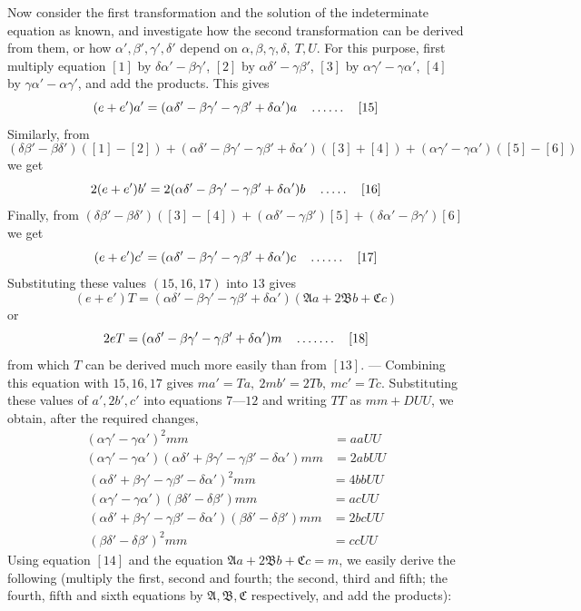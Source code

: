 Now consider the first transformation and the solution of the indeterminate equation as known, and investigate how the second transformation can be derived from them, or how $\alpha',\beta',\gamma',\delta'$ depend on $\alpha,\beta,\gamma,\delta,\ T,U$. For this purpose, first multiply equation $[1]$ by $\delta\alpha'-\beta\gamma'$, $[2]$ by $\alpha\delta'-\gamma\beta'$, $[3]$ by $\alpha\gamma'-\gamma\alpha'$, $[4]$ by $\gamma\alpha'-\alpha\gamma'$, and add the products. This gives
\[
(e+e')a'=(\alpha\delta'-\beta\gamma'-\gamma\beta'+\delta\alpha')a\quad\mathinner{.\,.\,.\,.\,.\,.}\quad[15]
\]
Similarly, from
\[
(\delta\beta'-\beta\delta')([1]-[2])+(\alpha\delta'-\beta\gamma'-\gamma\beta'+\delta\alpha')([3]+[4])+(\alpha\gamma'-\gamma\alpha')([5]-[6])
\]
we get
\[
2(e+e')b'=2(\alpha\delta'-\beta\gamma'-\gamma\beta'+\delta\alpha')b\quad\mathinner{.\,.\,.\,.\,.}\quad[16]
\]
Finally, from $(\delta\beta'-\beta\delta')([3]-[4])+(\alpha\delta'-\gamma\beta')[5]+(\delta\alpha'-\beta\gamma')[6]$ we get
\[
(e+e')c'=(\alpha\delta'-\beta\gamma'-\gamma\beta'+\delta\alpha')c\quad\mathinner{.\,.\,.\,.\,.\,.}\quad[17]
\]
Substituting these values $(15,16,17)$ into $13$ gives
\[
(e+e')T=(\alpha\delta'-\beta\gamma'-\gamma\beta'+\delta\alpha')(\mathfrak{A}a+2\mathfrak{B}b+\mathfrak{C}c)
\]
or
\[
2eT=(\alpha\delta'-\beta\gamma'-\gamma\beta'+\delta\alpha')m\quad\mathinner{.\,.\,.\,.\,.\,.\,.}\quad[18]
\]
from which $T$ can be derived much more easily than from $[13]$. --- Combining this equation with $15,16,17$ gives $ma'=Ta,\ 2mb'=2Tb,\ mc'=Tc$. Substituting these values of $a',2b',c'$ into equations $7\text{---}12$ and writing $TT$ as $mm+DUU$, we obtain, after the required changes,
\[
\begin{aligned}
(\alpha\gamma'-\gamma\alpha')^2mm&=aaUU\\
(\alpha\gamma'-\gamma\alpha')(\alpha\delta'+\beta\gamma'-\gamma\beta'-\delta\alpha')mm&=2abUU
\end{aligned}
\]
\[
\begin{aligned}
(\alpha\delta'+\beta\gamma'-\gamma\beta'-\delta\alpha')^2mm&=4bbUU\\
(\alpha\gamma'-\gamma\alpha')(\beta\delta'-\delta\beta')mm&=acUU\\
(\alpha\delta'+\beta\gamma'-\gamma\beta'-\delta\alpha')(\beta\delta'-\delta\beta')mm&=2bcUU\\
(\beta\delta'-\delta\beta')^2mm&=ccUU
\end{aligned}
\]
Using equation $[14]$ and the equation $\mathfrak{A}a+2\mathfrak{B}b+\mathfrak{C}c=m$, we easily derive the following (multiply the first, second and fourth; the second, third and fifth; the fourth, fifth and sixth equations by $\mathfrak{A},\mathfrak{B},\mathfrak{C}$ respectively, and add the products):
